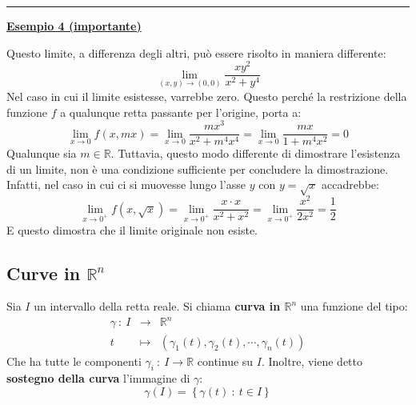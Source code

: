 \documentclass[a4paper]{article}
\newcommand{\longline}{\noindent\rule{\textwidth}{0.4pt}}
\newcommand{\definition}[1]{\textcolor{Red3}{\textbf{#1}}}
\newcommand{\example}[1]{\textcolor{Green4}{\textbf{#1}}}
\begin{document}
	\longline

	\begin{flushleft}
		\example{\underline{Esempio 4 (importante)}}
	\end{flushleft}
	Questo limite, a differenza degli altri, può essere risolto in maniera differente:
	\begin{equation*}
		\displaystyle\lim_{\left(x,y\right) \rightarrow \left(0,0\right)} \dfrac{xy^{2}}{x^{2} + y^{4}}
	\end{equation*}
	Nel caso in cui il limite esistesse, varrebbe zero. Questo perché la restrizione della funzione $f$ a qualunque retta passante per l'origine, porta a:
	\begin{equation*}
		\displaystyle\lim_{x \rightarrow 0} f\left(x,mx\right) = \displaystyle\lim_{x \rightarrow 0} \dfrac{mx^{3}}{x^{2} + m^{4}x^{4}} = \displaystyle\lim_{x \rightarrow 0} \dfrac{mx}{1 + m^{4}x^{2}} = 0
	\end{equation*}
	Qualunque sia $m \in \mathbb{R}$. Tuttavia, questo modo differente di dimostrare l'esistenza di un limite, non è una condizione sufficiente per concludere la dimostrazione. Infatti, nel caso in cui ci si muovesse lungo l'asse $y$ con $y = \sqrt{x}$ accadrebbe:
	\begin{equation*}
		\displaystyle\lim_{x \rightarrow 0^{+}} f\left(x, \sqrt{x}\right) = \displaystyle\lim_{x \rightarrow 0^{+}} \dfrac{x \cdot x}{x^{2} + x^{2}} = \displaystyle\lim_{x \rightarrow 0^{+}} \dfrac{x^{2}}{2x^{2}} = \dfrac{1}{2}
	\end{equation*}
	E questo dimostra che il limite originale non esiste.\newpage

	\subsection{Curve in $\mathbb{R}^{n}$}

	\begin{boxdef}
		Sia $I$ un intervallo della retta reale. Si chiama \definition{curva in $\mathbb{R}^{n}$} una funzione del tipo:
		\begin{equation}\label{eq: curva in Rn}
			\begin{array}{rcl}
				\gamma \: : \: I &\rightarrow& \mathbb{R}^{n} \\ [.5em]
				t &\mapsto& \left(\gamma_{1}\left(t\right), \gamma_{2}\left(t\right), \cdots, \gamma_{n}\left(t\right)\right)
			\end{array}
		\end{equation}
		Che ha tutte le componenti $\gamma_{i} \: : \: I \rightarrow \mathbb{R}$ continue su $I$. Inoltre, viene detto \textbf{sostegno della curva} l'immagine di $\gamma$:
		\begin{equation}\label{eq: sostegno della curva}
			\gamma\left(I\right) = \left\{\gamma\left(t\right) \: : \: t \in I\right\}
		\end{equation}
	\end{boxdef}
\end{document}

